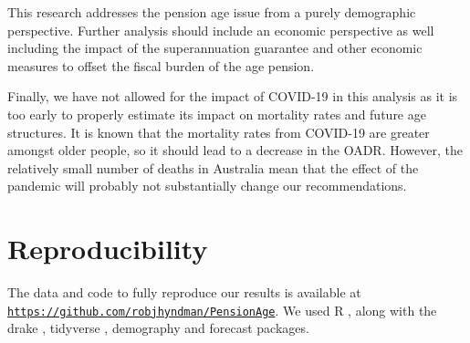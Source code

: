 \documentclass[11pt,a4paper,]{article}
\begin{document}
This research addresses the pension age issue from a purely demographic perspective. Further analysis should include an economic perspective as well including the impact of the superannuation guarantee and other economic measures to offset the fiscal burden of the age pension.

Finally, we have not allowed for the impact of COVID-19 in this analysis as it is too early to properly estimate its impact on mortality rates and future age structures. It is known that the mortality rates from COVID-19 are greater amongst older people, so it should lead to a decrease in the OADR. However, the relatively small number of deaths in Australia mean that the effect of the pandemic will probably not substantially change our recommendations.

\hypertarget{reproducibility}{%
\section*{Reproducibility}\label{reproducibility}}

The data and code to fully reproduce our results is available at \href{https://github.com/robjhyndman/PensionAge}{\texttt{https://github.com/robjhyndman/PensionAge}}. We used R \autocite{RCore}, along with the drake \autocite{Rdrake}, tidyverse \autocite{Rtidyverse}, demography \autocite{Rdemography} and forecast \autocite{Rforecast} packages.

\printbibliography
\end{document}

